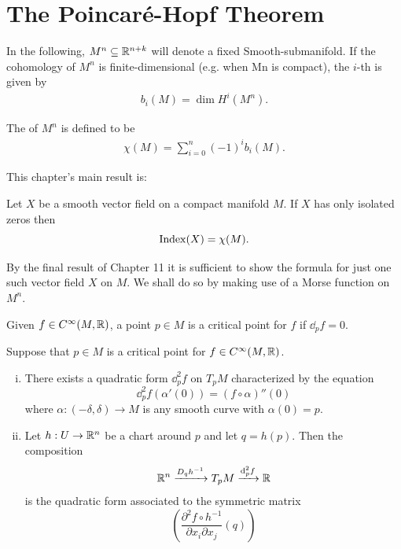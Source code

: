 \chapter{The Poincar\'e-Hopf Theorem }
In the following, $M^n\subseteq{\ensuremath{\mathbb{R}}}^{n+k}$ will denote a fixed Smooth-submanifold. If the
cohomology of $M^n$ is finite-dimensional (e.g. when Mn is compact), the $i$-th
 is given by
\begin{align}\label{eq:12-1}
  b_i(M) = \dim H^i(M^n).
\end{align}

The  of $M^n$ is defined to be
\begin{align}\label{eq:12-2}
  \chi(M) = \sum_{i=0}^{n }{(-1)^i b_i(M)}.
\end{align}

This chapter's main result is:
\begin{theorem}\label{theorem:12-1}
  Let $X$ be a smooth vector field on a compact manifold $M$. If $X$ has only isolated zeros then
  \[
    \mathrm{Index}(X) = \chi(M).
  \]
\end{theorem}

By the final result of Chapter 11 it is sufficient to show the formula for just one
such vector field $X$ on $M$. We shall do so by making use of a Morse function on $M^n$.

Given $f\in C^\infty(M, {\mathbb{R}})$, a point $p\in M$ is a critical point for $f$ if $\dd_pf=0$.

\begin{proposition}\label{proposition:12-2}
  Suppose that $p\in M$ is a critical point for $f\in C^\infty(M, {\mathbb{R}})$.
  \begin{enumerate}[(i)]
    \item There exists a quadratic form $\dd_p^2f$ on $T_pM$ characterized by the equation
      \[
        \dd_p^2f(\alpha'(0)) = (f\circ\alpha)''(0)
      \]
      where $\alpha:(-\delta,\delta)\to M$ is any smooth curve with $\alpha(0)=p$.
    \item Let $h:U\to{\ensuremath{\mathbb{R}}}^n$ be a chart around $p$ and let $q=h(p)$. Then the composition 
      \[
        \RR^n\xra[D_qh^{-1}] T_pM\xra[\dd_p^2f] \RR
      \]
      is the quadratic form associated to the symmetric matrix
      \[
        \left(\frac{\partial^2f\circ h^{-1}}{\partial x_i\partial x_j}(q)\right)
      \]
  \end{enumerate}
\end{proposition}

